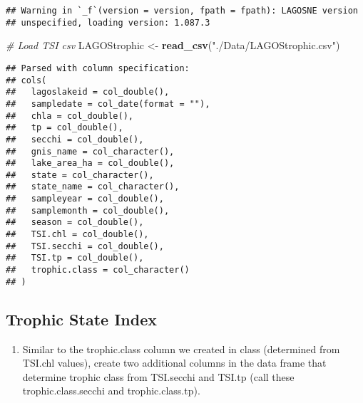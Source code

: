 \documentclass[]{article}
\newenvironment{Shaded}{\begin{snugshade}}{\end{snugshade}}
\newcommand{\CommentTok}[1]{\textcolor[rgb]{0.56,0.35,0.01}{\textit{#1}}}
\newcommand{\KeywordTok}[1]{\textcolor[rgb]{0.13,0.29,0.53}{\textbf{#1}}}
\newcommand{\NormalTok}[1]{#1}
\newcommand{\StringTok}[1]{\textcolor[rgb]{0.31,0.60,0.02}{#1}}
\providecommand{\tightlist}{%
  \setlength{\itemsep}{0pt}\setlength{\parskip}{0pt}}
\begin{document}
\begin{verbatim}
## Warning in `_f`(version = version, fpath = fpath): LAGOSNE version
## unspecified, loading version: 1.087.3
\end{verbatim}

\begin{Shaded}
\begin{Highlighting}[]
\CommentTok{# Load TSI csv}
\NormalTok{LAGOStrophic <-}\StringTok{ }\KeywordTok{read_csv}\NormalTok{(}\StringTok{"./Data/LAGOStrophic.csv"}\NormalTok{)}
\end{Highlighting}
\end{Shaded}

\begin{verbatim}
## Parsed with column specification:
## cols(
##   lagoslakeid = col_double(),
##   sampledate = col_date(format = ""),
##   chla = col_double(),
##   tp = col_double(),
##   secchi = col_double(),
##   gnis_name = col_character(),
##   lake_area_ha = col_double(),
##   state = col_character(),
##   state_name = col_character(),
##   sampleyear = col_double(),
##   samplemonth = col_double(),
##   season = col_double(),
##   TSI.chl = col_double(),
##   TSI.secchi = col_double(),
##   TSI.tp = col_double(),
##   trophic.class = col_character()
## )
\end{verbatim}

\hypertarget{trophic-state-index}{%
\subsection{Trophic State Index}\label{trophic-state-index}}

\begin{enumerate}
\def\labelenumi{\arabic{enumi}.}
\setcounter{enumi}{4}
\tightlist
\item
  Similar to the trophic.class column we created in class (determined
  from TSI.chl values), create two additional columns in the data frame
  that determine trophic class from TSI.secchi and TSI.tp (call these
  trophic.class.secchi and trophic.class.tp).
\end{enumerate}
\end{document}
